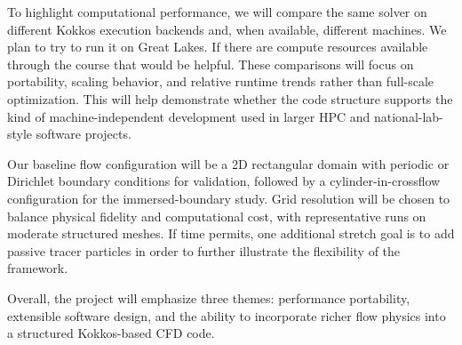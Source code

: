 To highlight computational performance, we will compare the same solver on different Kokkos execution backends and, when available, different machines. We plan to try to run it on Great Lakes. If there are compute resources
available through the course that would be helpful.
These comparisons will focus on portability, scaling behavior, and relative runtime trends rather than full-scale optimization.
This will help demonstrate whether the code structure supports the kind of machine-independent development used in larger HPC and national-lab-style software projects.

Our baseline flow configuration will be a 2D rectangular domain with periodic or Dirichlet boundary conditions for validation, followed by a cylinder-in-crossflow configuration for the immersed-boundary study.
Grid resolution will be chosen to balance physical fidelity and computational cost, with representative runs on moderate structured meshes. 
If time permits, one additional stretch goal is to add passive tracer particles in order to further illustrate the flexibility of the framework.

Overall, the project will emphasize three themes: performance portability, extensible software design, and the ability to incorporate richer flow physics into a structured Kokkos-based CFD code.